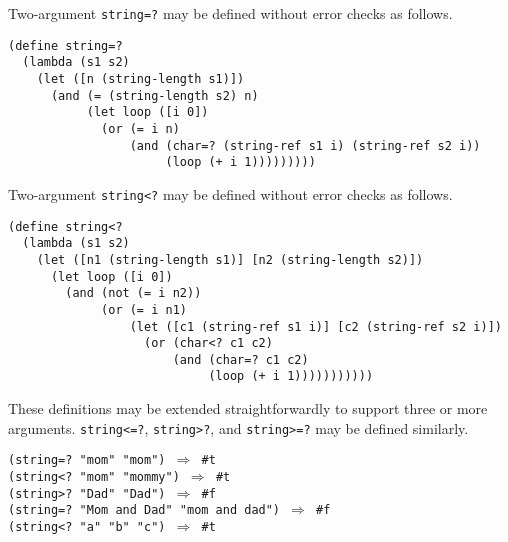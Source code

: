 Two-argument \texttt{string=?} may be defined without error checks as follows.


\begin{alltt}
(define string=?
  (lambda (s1 s2)
    (let ([n (string-length s1)])
      (and (= (string-length s2) n)
           (let loop ([i 0])
             (or (= i n)
                 (and (char=? (string-ref s1 i) (string-ref s2 i))
                      (loop (+ i 1)))))))))
\end{alltt}


Two-argument \texttt{string\textless{}?} may be defined without error checks as follows.


\begin{alltt}
(define string\textless{}?
  (lambda (s1 s2)
    (let ([n1 (string-length s1)] [n2 (string-length s2)])
      (let loop ([i 0])
        (and (not (= i n2))
             (or (= i n1)
                 (let ([c1 (string-ref s1 i)] [c2 (string-ref s2 i)])
                   (or (char\textless{}? c1 c2)
                       (and (char=? c1 c2)
                            (loop (+ i 1)))))))))))
\end{alltt}


These definitions may be extended straightforwardly to support
three or more arguments.
\texttt{string\textless{}=?}, \texttt{string\textgreater{}?}, and \texttt{string\textgreater{}=?}
may be defined similarly.


\begin{alltt}
(string=? "mom" "mom") \(\Rightarrow\) \#{}t
(string\textless{}? "mom" "mommy") \(\Rightarrow\) \#{}t
(string\textgreater{}? "Dad" "Dad") \(\Rightarrow\) \#{}f
(string=? "Mom and Dad" "mom and dad") \(\Rightarrow\) \#{}f
(string\textless{}? "a" "b" "c") \(\Rightarrow\) \#{}t
\end{alltt}

